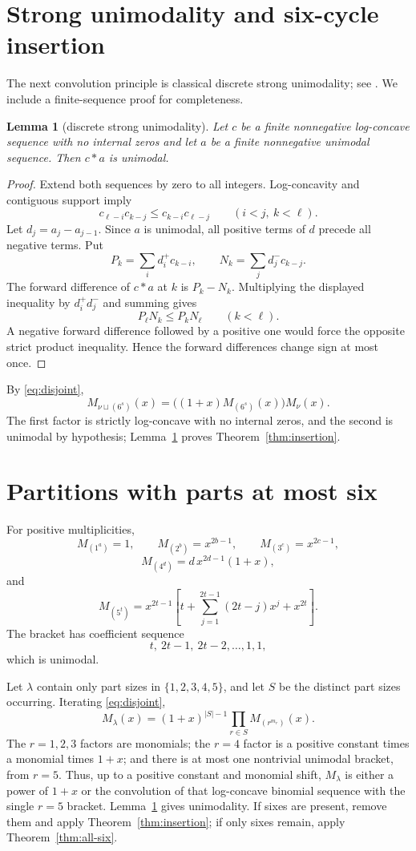 \documentclass[11pt]{amsart}
\newtheorem{lemma}{Lemma}
\begin{document}
\section{Strong unimodality and six-cycle insertion}
The next convolution principle is classical discrete strong unimodality; see \cite{KG}. We include a finite-sequence proof for completeness.

\begin{lemma}[discrete strong unimodality]\label{lem:strong}
Let \(c\) be a finite nonnegative log-concave sequence with no internal zeros and let \(a\) be a finite nonnegative unimodal sequence. Then \(c*a\) is unimodal.
\end{lemma}
\begin{proof}
Extend both sequences by zero to all integers. Log-concavity and contiguous support imply
\[
c_{\ell-i}c_{k-j}\le c_{k-i}c_{\ell-j}\qquad(i<j,\ k<\ell).
\]
Let \(d_j=a_j-a_{j-1}\). Since \(a\) is unimodal, all positive terms of \(d\) precede all negative terms. Put
\[
P_k=\sum_i d_i^+c_{k-i},\qquad N_k=\sum_j d_j^-c_{k-j}.
\]
The forward difference of \(c*a\) at \(k\) is \(P_k-N_k\). Multiplying the displayed inequality by \(d_i^+d_j^-\) and summing gives
\[
P_\ell N_k\le P_kN_\ell\qquad(k<\ell).
\]
A negative forward difference followed by a positive one would force the opposite strict product inequality. Hence the forward differences change sign at most once.
\end{proof}

By \eqref{eq:disjoint},
\[
M_{\nu\sqcup(6^s)}(x)
=
\bigl((1+x)M_{(6^s)}(x)\bigr)M_\nu(x).
\]
The first factor is strictly log-concave with no internal zeros, and the second is unimodal by hypothesis; Lemma~\ref{lem:strong} proves Theorem~\ref{thm:insertion}.

\section{Partitions with parts at most six}
For positive multiplicities,
\[
M_{(1^a)}=1,\qquad M_{(2^b)}=x^{2b-1},\qquad M_{(3^c)}=x^{2c-1},
\]
\[
M_{(4^d)}=d\,x^{2d-1}(1+x),
\]
and
\[
M_{(5^t)}
=x^{2t-1}
\left[t+\sum_{j=1}^{2t-1}(2t-j)x^j+x^{2t}\right].
\]
The bracket has coefficient sequence
\[
t,\ 2t-1,\ 2t-2,\ldots,1,1,
\]
which is unimodal.

Let \(\lambda\) contain only part sizes in \(\{1,2,3,4,5\}\), and let \(S\) be the distinct part sizes occurring. Iterating \eqref{eq:disjoint},
\[
M_\lambda(x)
=(1+x)^{|S|-1}\prod_{r\in S}M_{(r^{m_r})}(x).
\]
The \(r=1,2,3\) factors are monomials; the \(r=4\) factor is a positive constant times a monomial times \(1+x\); and there is at most one nontrivial unimodal bracket, from \(r=5\). Thus, up to a positive constant and monomial shift, \(M_\lambda\) is either a power of \(1+x\) or the convolution of that log-concave binomial sequence with the single \(r=5\) bracket. Lemma~\ref{lem:strong} gives unimodality. If sixes are present, remove them and apply Theorem~\ref{thm:insertion}; if only sixes remain, apply Theorem~\ref{thm:all-six}.
\end{document}
